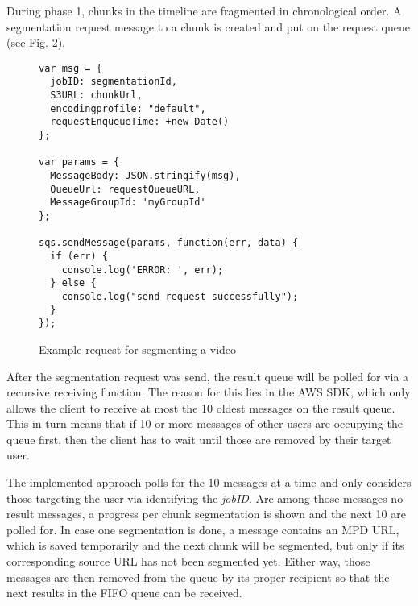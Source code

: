 \documentclass[conference]{IEEEtran}
\begin{document}
During phase 1, chunks in the timeline are fragmented in chronological order.
A segmentation request message to a chunk is created and put on the request queue (see Fig. 2).
\begin{figure}[H]
\begin{lstlisting}
var msg = {
  jobID: segmentationId,
  S3URL: chunkUrl,
  encodingprofile: "default",
  requestEnqueueTime: +new Date()
};

var params = {
  MessageBody: JSON.stringify(msg),
  QueueUrl: requestQueueURL,
  MessageGroupId: 'myGroupId'
};

sqs.sendMessage(params, function(err, data) {
  if (err) {
    console.log('ERROR: ', err);
  } else {
    console.log("send request successfully");
  }
});
\end{lstlisting}
\caption{Example request for segmenting a video}
\end{figure}
After the segmentation request was send, the result queue will be polled for via a recursive receiving function.
The reason for this lies in the AWS SDK, which only allows the client to receive at most the 10 oldest messages on the result queue.
This in turn means that if 10 or more messages of other users are occupying the queue first, then the client has to wait until those are removed by their target user.

The implemented approach polls for the 10 messages at a time and only considers those targeting the user via identifying the \textit{jobID}.
Are among those messages no result messages, a progress per chunk segmentation is shown and the next 10 are polled for.
In case one segmentation is done, a message contains an MPD URL, which is saved temporarily and the next chunk will be segmented, but only if its corresponding source URL has not been segmented yet.
Either way, those messages are then removed from the queue by its proper recipient so that the next results in the FIFO queue can be received.
\\
\end{document}
